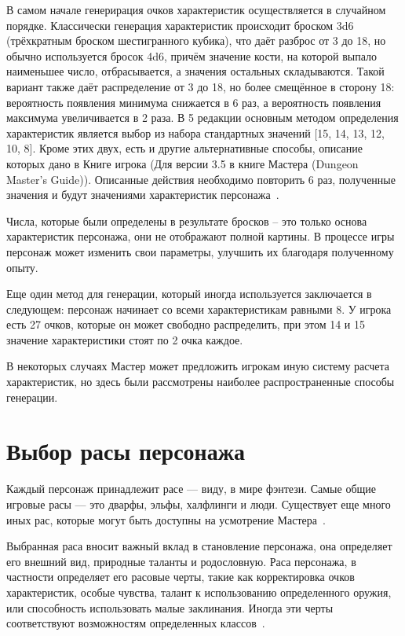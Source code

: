 В самом начале генерирация очков характеристик осуществляется в случайном порядке. 
Классически генерация характеристик происходит броском 3d6 (трёхкратным броском шестигранного кубика), что даёт разброс от 3 до 18, но обычно используется бросок 4d6, причём значение кости, на которой выпало наименьшее число, отбрасывается, а значения остальных складываются. Такой вариант также даёт распределение от 3 до 18, но более смещённое в сторону 18: вероятность появления минимума снижается в 6 раз, а вероятность появления максимума увеличивается в 2 раза. В 5 редакции основным методом определения характеристик является выбор из набора стандартных значений [15, 14, 13, 12, 10, 8]. Кроме этих двух, есть и другие альтернативные способы, описание которых дано в Книге игрока (Для версии 3.5 в книге Мастера (Dungeon Master’s Guide)). Описанные действия необходимо повторить 6 раз, полученные значения и будут значениями характеристик персонажа~\cite{DandDforms, longstoryshort}.

Числа, которые были определены в результате бросков -- это только основа характеристик персонажа, они не отображают полной картины. В процессе игры персонаж может изменить свои параметры, улучшить их благодаря полученному опыту.

Еще один метод для генерации, который иногда используется заключается в следующем: персонаж начинает со всеми характеристикам равными 8. У игрока есть 27 очков, которые он может свободно распределить, при этом 14 и 15 значение характеристики стоят по 2 очка каждое.

В некоторых случаях Мастер может предложить игрокам иную систему расчета характеристик, но здесь были рассмотрены наиболее распространенные способы генерации.

\section{Выбор расы персонажа}

Каждый персонаж принадлежит расе --- виду, в мире фэнтези. Самые общие игровые расы --- это дварфы, эльфы, халфлинги и люди. Существует еще много иных рас, которые могут быть доступны на усмотрение Мастера~\cite{screenrant, DandDforms}.

Выбранная раса вносит важный вклад в становление персонажа, она определяет его внешний вид, природные таланты и родословную. Раса персонажа, в частности определяет его расовые черты, такие как корректировка очков характеристик, особые чувства, талант к использованию определенного оружия, или способность использовать малые заклинания. Иногда эти черты соответствуют возможностям определенных классов~\cite{PlayersHandbook, MonsterManual, MastersGuide}.

